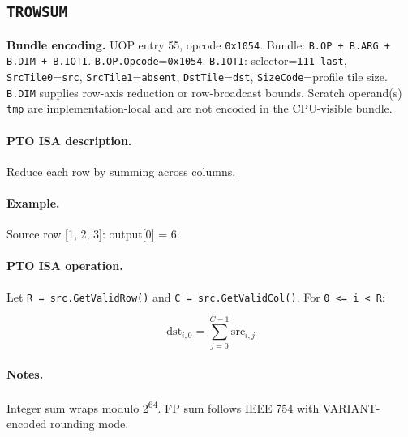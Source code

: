 \subsection{\texttt{TROWSUM}}
\noindent\textbf{Bundle encoding.} UOP entry 55, opcode \texttt{0x1054}. Bundle: \texttt{B.OP + B.ARG + B.DIM + B.IOTI}. \texttt{B.OP.Opcode}=\texttt{0x1054}. \texttt{B.IOTI}: selector=\texttt{111 last}, \texttt{SrcTile0}=\texttt{src}, \texttt{SrcTile1}=\texttt{absent}, \texttt{DstTile}=\texttt{dst}, \texttt{SizeCode}=profile tile size. \texttt{B.DIM} supplies row-axis reduction or row-broadcast bounds. Scratch operand(s) \texttt{tmp} are implementation-local and are not encoded in the CPU-visible bundle.\par\smallskip
{\small
\paragraph{PTO ISA description.}
Reduce each row by summing across columns.
\paragraph{Example.}
Source row [1, 2, 3]: output[0] = 6.
\par\smallskip
\paragraph{PTO ISA operation.}
Let \texttt{R = src.GetValidRow()} and \texttt{C = src.GetValidCol()}. For \texttt{0 \textless{}= i \textless{} R}:

\[
\mathrm{dst}_{i,0} = \sum_{j=0}^{C-1} \mathrm{src}_{i,j}
\]
}\par\smallskip
\paragraph{Notes.}
Integer sum wraps modulo 2\textsuperscript{64}. FP sum follows IEEE 754 with VARIANT-encoded rounding mode.
